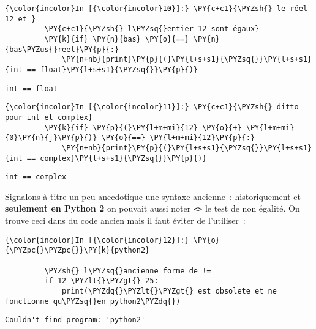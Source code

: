     \begin{Verbatim}[commandchars=\\\{\}]
{\color{incolor}In [{\color{incolor}10}]:} \PY{c+c1}{\PYZsh{} le réel 12 et }
         \PY{c+c1}{\PYZsh{} l\PYZsq{}entier 12 sont égaux}
         \PY{k}{if} \PY{n}{bas} \PY{o}{==} \PY{n}{bas\PYZus{}reel}\PY{p}{:}
             \PY{n+nb}{print}\PY{p}{(}\PY{l+s+s1}{\PYZsq{}}\PY{l+s+s1}{int == float}\PY{l+s+s1}{\PYZsq{}}\PY{p}{)}
\end{Verbatim}


    \begin{Verbatim}[commandchars=\\\{\}]
int == float

    \end{Verbatim}

    \begin{Verbatim}[commandchars=\\\{\}]
{\color{incolor}In [{\color{incolor}11}]:} \PY{c+c1}{\PYZsh{} ditto pour int et complex}
         \PY{k}{if} \PY{p}{(}\PY{l+m+mi}{12} \PY{o}{+} \PY{l+m+mi}{0}\PY{n}{j}\PY{p}{)} \PY{o}{==} \PY{l+m+mi}{12}\PY{p}{:}
             \PY{n+nb}{print}\PY{p}{(}\PY{l+s+s1}{\PYZsq{}}\PY{l+s+s1}{int == complex}\PY{l+s+s1}{\PYZsq{}}\PY{p}{)}
\end{Verbatim}


    \begin{Verbatim}[commandchars=\\\{\}]
int == complex

    \end{Verbatim}

    Signalons à titre un peu anecdotique une syntaxe ancienne~:
historiquement et \textbf{seulement en Python 2} on pouvait aussi noter
\texttt{\textless{}\textgreater{}} le test de non égalité. On trouve
ceci dans du code ancien mais il faut éviter de l'utiliser~:

    \begin{Verbatim}[commandchars=\\\{\}]
{\color{incolor}In [{\color{incolor}12}]:} \PY{o}{\PYZpc{}\PYZpc{}}\PY{k}{python2}
         
         \PYZsh{} l\PYZsq{}ancienne forme de !=
         if 12 \PYZlt{}\PYZgt{} 25:
             print(\PYZdq{}\PYZlt{}\PYZgt{} est obsolete et ne fonctionne qu\PYZsq{}en python2\PYZdq{})
\end{Verbatim}


    \begin{Verbatim}[commandchars=\\\{\}]
Couldn't find program: 'python2'

    \end{Verbatim}

